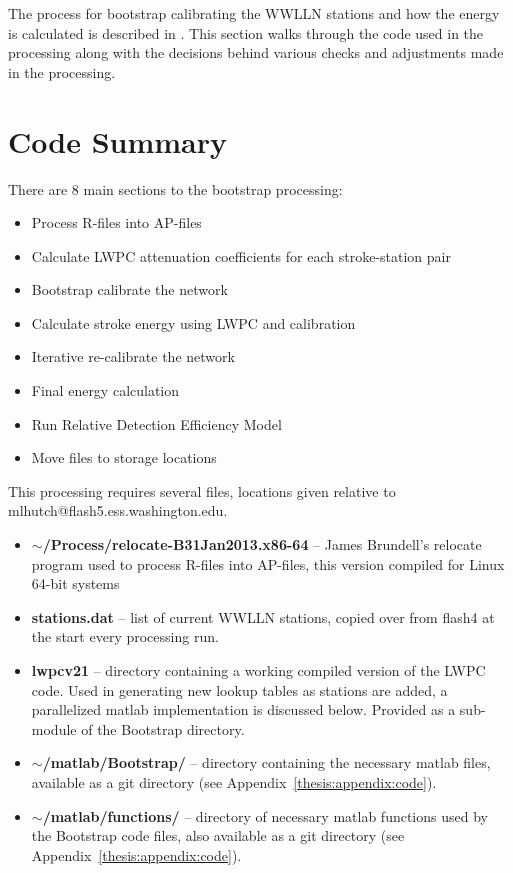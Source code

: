 The process for bootstrap calibrating the WWLLN stations and how the energy is calculated is described in \citet{Hutchins2012}.
This section walks through the code used in the processing along with the decisions behind various checks and adjustments made in the processing.

\section{Code Summary}

There are 8 main sections to the bootstrap processing:

\begin{itemize}
	\item{Process R-files into AP-files}
	\item{Calculate LWPC attenuation coefficients for each stroke-station pair}
	\item{Bootstrap calibrate the network}
	\item{Calculate stroke energy using LWPC and calibration}
	\item{Iterative re-calibrate the network}
	\item{Final energy calculation}
	\item{Run Relative Detection Efficiency Model}
	\item{Move files to storage locations}
\end{itemize}

This processing requires several files, locations given relative to mlhutch@flash5.ess.washington.edu.

\begin{itemize}
	\item{\textbf{$\sim$/Process/relocate-B31Jan2013.x86-64} -- James Brundell's relocate program used to process R-files into AP-files, this version compiled for Linux 64-bit systems}
	\item{\textbf{stations.dat} -- list of current WWLLN stations, copied over from flash4 at the start every processing run.}
	\item{\textbf{lwpcv21} -- directory containing a working compiled version of the LWPC code.
		Used in generating new lookup tables as stations are added, a parallelized matlab implementation is discussed below.
		Provided as a sub-module of the Bootstrap directory.}
	\item{\textbf{$\sim$/matlab/Bootstrap/} -- directory containing the necessary matlab files, available as a git directory (see Appendix~\ref{thesis:appendix:code}).}
	\item{\textbf{$\sim$/matlab/functions/} -- directory of necessary matlab functions used by the Bootstrap code files, also available as a git directory (see Appendix~\ref{thesis:appendix:code}).}
\end{itemize}

